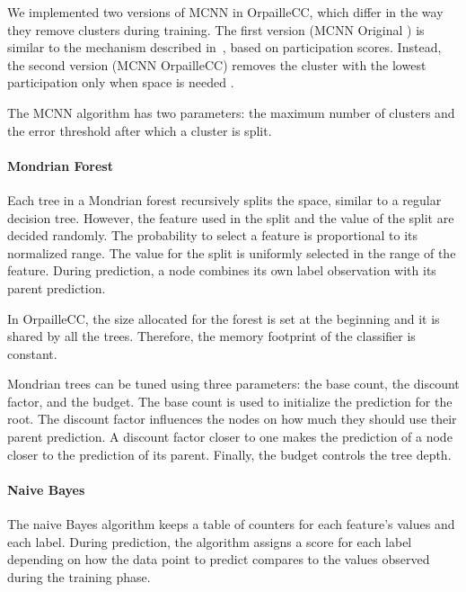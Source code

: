 We implemented two versions of MCNN in OrpailleCC, which differ in the way
they remove clusters during training. The first version (MCNN Original
) is similar to the
mechanism described in~\cite{mc-nn}, based on participation scores.
Instead, the second version (MCNN OrpailleCC) removes the cluster with the
lowest participation only when space is needed . 

The MCNN algorithm has two
parameters: the maximum number of clusters and the
error threshold after which a cluster is split. 


\paragraph{Mondrian Forest~\cite{mondrian2014}}
Each tree in a Mondrian forest recursively
splits the space, similar to a regular decision tree.
However, the feature used in the split and the value of the
split are decided randomly. The probability to select a feature is 
proportional to its normalized range. The value for the split is
uniformly selected in the range of the feature. During prediction, a node
combines its own label observation  with its parent prediction.

In OrpailleCC, the size allocated for the forest
is set at the beginning and it is shared by all
the trees.  Therefore, the memory footprint of the
classifier is constant.

Mondrian trees can be tuned using three
parameters: the base count, the discount factor,
and the budget. The base count is used to
initialize the prediction for the root. The
discount factor influences the nodes on how much
they should use their parent prediction. A
discount factor closer to one makes the prediction
of a node closer to the prediction of its parent.
Finally, the budget controls the tree depth.

\paragraph{Naive Bayes~\cite{naive_bayes}}
The naive Bayes algorithm keeps a table of
counters for each feature's values and each label.
During prediction, the algorithm assigns a
score for each label depending on how the data
point to predict compares to the values observed
during the training phase.

